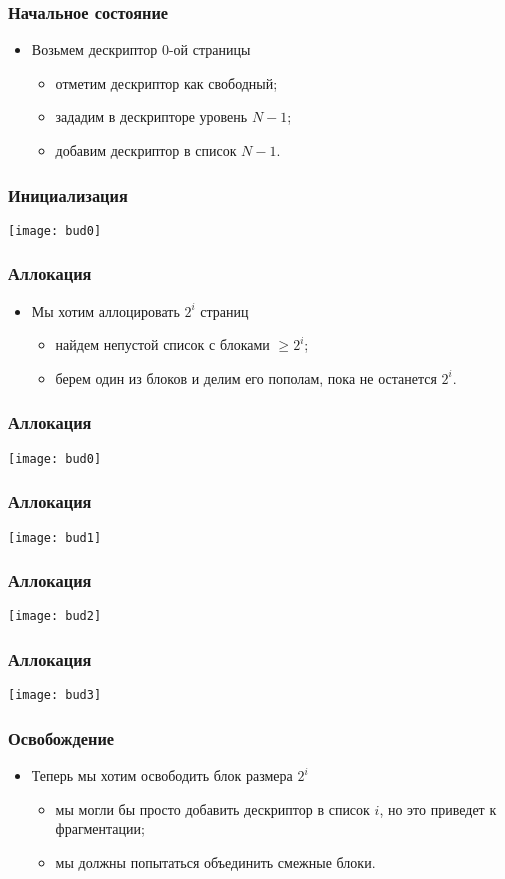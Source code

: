\begin{frame}
\frametitle{Начальное состояние}
\begin{itemize}
    \item<1->Возьмем дескриптор $0$-ой страницы
    \begin{itemize}
        \item<2->отметим дескриптор как свободный;
        \item<3->зададим в дескрипторе уровень $N-1$;
        \item<4->добавим дескриптор в список $N-1$.
    \end{itemize}
\end{itemize}
\end{frame}

\begin{frame}
\frametitle{Инициализация}
\texttt{[image: bud0]}
\end{frame}

\begin{frame}
\frametitle{Аллокация}
\begin{itemize}
    \item<1->Мы хотим аллоцировать $2^i$ страниц
    \begin{itemize}
        \item<2->найдем непустой список с блоками $\ge 2^i$;
        \item<3->берем один из блоков и делим его пополам, пока не останется
        $2^i$.
    \end{itemize}
\end{itemize}
\end{frame}

\begin{frame}
\frametitle{Аллокация}
\texttt{[image: bud0]}
\end{frame}

\begin{frame}
\frametitle{Аллокация}
\texttt{[image: bud1]}
\end{frame}

\begin{frame}
\frametitle{Аллокация}
\texttt{[image: bud2]}
\end{frame}

\begin{frame}
\frametitle{Аллокация}
\texttt{[image: bud3]}
\end{frame}

\begin{frame}
\frametitle{Освобождение}
\begin{itemize}
    \item<1->Теперь мы хотим освободить блок размера $2^i$
    \begin{itemize}
        \item<2->мы могли бы просто добавить дескриптор в список $i$, но это
        приведет к фрагментации;
        \item<3->мы должны попытаться объединить смежные блоки.
    \end{itemize}
\end{itemize}
\end{frame}

